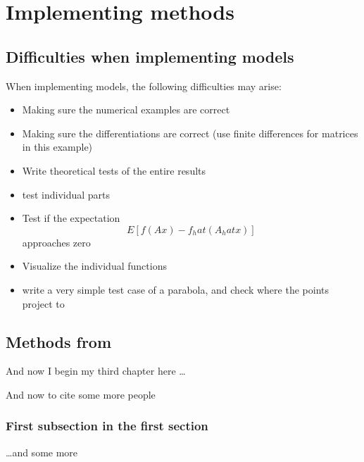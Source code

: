 \chapter{Implementing methods}

\ifpdf
    \graphicspath{{Chapter3/Figs/Raster/}{Chapter3/Figs/PDF/}{Chapter3/Figs/}}
\else
    \graphicspath{{Chapter3/Figs/Vector/}{Chapter3/Figs/}}
\fi

\section{Difficulties when implementing models}
When implementing models, the following difficulties may arise:

\begin{itemize}
\item Making sure the numerical examples are correct
\item Making sure the differentiations are correct (use finite differences for matrices in this example)
\item Write theoretical tests of the entire results
\item test individual parts
\item Test if the expectation $$ E[ f(A x) - f_hat(A_hat x) ] $$ approaches zero
\item Visualize the individual functions
\item write a very simple test case of a parabola, and check where the points project to
\end{itemize}

\section{Methods from }
And now I begin my third chapter here \dots

And now to cite some more people~\citet{Rea85,Ancey1996}

\subsection{First subsection in the first section}
\dots and some more 


